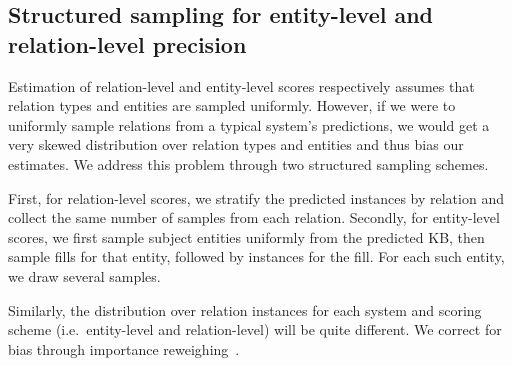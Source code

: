 \subsection{Structured sampling for entity-level and relation-level precision}
Estimation of relation-level and entity-level scores respectively assumes that relation types and entities are sampled uniformly.
However, if we were to uniformly sample relations from a typical system's predictions, 
  we would get a very skewed distribution over relation types and entities and thus bias our estimates.
We address this problem through two structured sampling schemes.

First, for relation-level scores, we stratify the predicted instances by relation and collect the same number of samples from each relation.
Secondly, for entity-level scores,  we first sample subject entities uniformly from the predicted KB, then sample fills for that entity, followed by instances for the fill.
For each such entity, we draw several samples.

Similarly, the distribution over relation instances for each system and scoring scheme (i.e.\ entity-level and relation-level) will be quite different. We correct for bias through importance reweighing~\citep{}.

